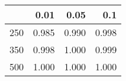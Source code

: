 % 
\begin{tabular}{rrrr}
  \hline
 & 0.01 & 0.05 & 0.1 \\ 
  \hline
250 & 0.985 & 0.990 & 0.998 \\ 
  350 & 0.998 & 1.000 & 0.999 \\ 
  500 & 1.000 & 1.000 & 1.000 \\ 
   \hline
\end{tabular}
